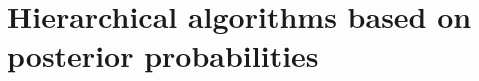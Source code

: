 \documentclass[10pt, a4paper]{article}
\newcommand{\m}[1]{\boldsymbol{#1}}
\begin{document}



\section{Hierarchical algorithms based on posterior probabilities}
\end{document}
